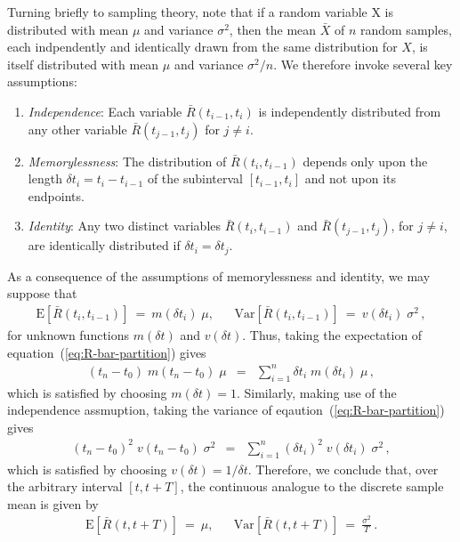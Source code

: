 \documentclass[a4paper]{book}
\begin{document}
Turning briefly to sampling theory, note that if a random variable X
is distributed with mean $\mu$ and variance $\sigma^2$, then
the mean $\bar{X}$ of $n$ random samples, each indpendently and
identically drawn from the same distribution for $X$, 
is itself distributed with mean $\mu$
and variance $\sigma^2/n$.
We therefore invoke several key assumptions:
\begin{enumerate}
\item {\em Independence}: 
Each variable $\bar{R}(t_{i-1},t_{i})$ is independently distributed
from any other variable $\bar{R}(t_{j-1},t_{j})$ for $j\ne i$.

\item {\em Memorylessness}: The distribution of
$\bar{R}(t_i,t_{i-1})$ depends only 
upon the length
$\delta t_i=t_i-t_{i-1}$ of the subinterval $[t_{i-1},t_i]$ and not
upon its endpoints.

\item {\em Identity}: Any two distinct variables 
$\bar{R}(t_i,t_{i-1})$ and $\bar{R}(t_{j-1},t_{j})$, for $j\ne i$,
are identically distributed if $\delta t_i=\delta t_j$. 
\end{enumerate}
As a consequence of the assumptions of memorylessness and identity, 
we may suppose that
\begin{eqnarray}
\mbox{E}[\bar{R}(t_i,t_{i-1})]~=~m(\delta t_i)\;\mu, &&
\mbox{Var}[\bar{R}(t_i,t_{i-1})]~=~v(\delta t_i)\;\sigma^2\,,
\end{eqnarray}
for unknown functions $m(\delta t)$ and $v(\delta t)$.
Thus, taking the expectation of equation~(\ref{eq:R-bar-partition}) gives
\begin{eqnarray}
(t_n-t_0)\;m(t_n-t_0)\;\mu & = & 
\sum_{i=1}^{n}\delta t_i\;m(\delta t_i)\;\mu\,,
\end{eqnarray}
which is satisfied by choosing $m(\delta t)=1$.
Similarly, making use of the independence assmuption, taking the variance of eqaution~(\ref{eq:R-bar-partition})
gives
\begin{eqnarray}
(t_n-t_0)^2 \;v(t_n-t_0)\;\sigma^2 & = & 
\sum_{i=1}^{n}(\delta t_i)^2\;v(\delta t_i)\;\sigma^2\,,
\end{eqnarray}
which is satisfied by choosing $v(\delta t)=1/\delta t$. 
Therefore, we conclude that, over the arbitrary interval $[t,t+T]$, the continuous analogue to the discrete sample mean is given by
\begin{eqnarray}
\mbox{E}[\bar{R}(t,t+T)]~=~\mu, &&
\mbox{Var}[\bar{R}(t,t+T)]~=~\frac{\sigma^2}{T}\,.
\end{eqnarray}
\end{document}
